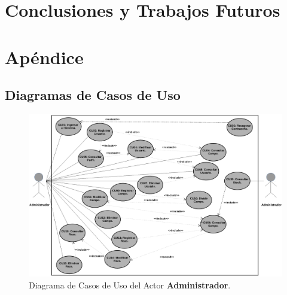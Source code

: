 \documentclass[11pt,oneside]{book}
\begin{document}
\chapter{Conclusiones y Trabajos Futuros}

\clearpage
\newpage
\chapter{Apéndice}\label{Ap}


\section{Diagramas de Casos de Uso}\label{ApDCU}
\begin{figure}[tbhp]
\centerline{\includegraphics[scale=0.5]{figs/capitulo_2_disenio/Diagrama_CU_Administrador.pdf}}
\caption{Diagrama de Casos de Uso del Actor \textbf{Administrador}.}
\label{Ap101}
\end{figure}
\end{document}

